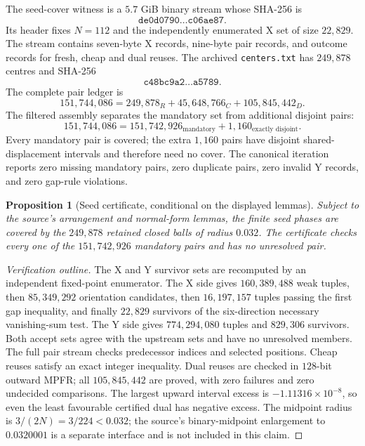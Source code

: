 \documentclass[10pt]{article}
\newtheorem{proposition}[theorem]{Proposition}
\theoremstyle{definition}
\begin{document}
The seed-cover witness is a $5.7$ GiB binary stream whose SHA-256 is
\[
\texttt{de0d0790\ldots c06ae87}.
\]
Its header fixes $N=112$ and the independently enumerated X set of size $22{,}829$. The stream contains seven-byte X records, nine-byte pair records, and outcome records for fresh, cheap and dual reuses. The archived \texttt{centers.txt} has $249{,}878$ centres and SHA-256
\[
\texttt{c48bc9a2\ldots a5789}.
\]
The complete pair ledger is
\begin{equation}\label{eq:seedcounts}
151{,}744{,}086
=249{,}878_R+45{,}648{,}766_C+105{,}845{,}442_D.
\end{equation}
The filtered assembly separates the mandatory set from additional disjoint pairs:
\begin{equation}\label{eq:seedfilter}
151{,}744{,}086=151{,}742{,}926_{\text{mandatory}}+1{,}160_{\text{exactly disjoint}}.
\end{equation}
Every mandatory pair is covered; the extra $1{,}160$ pairs have disjoint shared-displacement intervals and therefore need no cover. The canonical iteration reports zero missing mandatory pairs, zero duplicate pairs, zero invalid Y records, and zero gap-rule violations.

\begin{proposition}[Seed certificate, conditional on the displayed lemmas]\label{prop:seed}
Subject to the source's arrangement and normal-form lemmas, the finite seed phases are covered by the $249{,}878$ retained closed balls of radius $0.032$. The certificate checks every one of the $151{,}742{,}926$ mandatory pairs and has no unresolved pair.
\end{proposition}

\begin{proof}[Verification outline]
The X and Y survivor sets are recomputed by an independent fixed-point enumerator. The X side gives $160{,}389{,}488$ weak tuples, then $85{,}349{,}292$ orientation candidates, then $16{,}197{,}157$ tuples passing the first gap inequality, and finally $22{,}829$ survivors of the six-direction necessary vanishing-sum test. The Y side gives $774{,}294{,}080$ tuples and $829{,}306$ survivors. Both accept sets agree with the upstream sets and have no unresolved members. The full pair stream checks predecessor indices and selected positions. Cheap reuses satisfy an exact integer inequality. Dual reuses are checked in $128$-bit outward MPFR; all $105{,}845{,}442$ are proved, with zero failures and zero undecided comparisons. The largest upward interval excess is $-1.11316\times10^{-8}$, so even the least favourable certified dual has negative excess. The midpoint radius is $3/(2N)=3/224<0.032$; the source's binary-midpoint enlargement to $0.0320001$ is a separate interface and is not included in this claim.
\end{proof}
\end{document}
